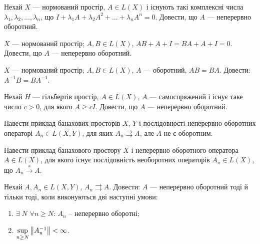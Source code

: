 \begin{exercise}
    Нехай $X$ --- нормований простір, $A \in L(X)$ і існують такі комплексні числа
    $\lambda_1, \lambda_2, ..., \lambda_n$, що $I + \lambda_1 A + \lambda_2 A^2
    + ... + \lambda_n A^n = 0$. Довести, що $A$ --- неперервно оборотний.
\end{exercise}

\begin{exercise}
    $X$ --- нормований простір; $A, B \in L(X)$, $AB+A+I=BA+A+I=0$.
    Довести, що $A$ --- неперервно оборотний.
\end{exercise}

\begin{exercise}
    $X$ --- нормований простір; $A, B \in L(X)$, $A$ --- оборотний, $AB=BA$.
    Довести: $A^{-1}B = BA^{-1}$.
\end{exercise}

\begin{exercise}
    Нехай $H$ --- гільбертів простір, $A \in L(X)$, $A$ --- самоспряжений
    і існує таке число $c > 0$, для якого $A \geq cI$.
    Довести, що $A$ --- неперервно оборотний.
\end{exercise}

\begin{exercise}
    Навести приклад банахових просторів $X$, $Y$ і послідовності неперервно
    оборотних операторі $A_n \in L(X,Y)$, для яких $A_n \rightrightarrows A$,
    але $A$ не є оборотним.
\end{exercise}

\begin{exercise}
    Навести приклад банахового простору $X$ і неперервно оборотного оператора
    $A \in L(X)$, для якого існує послідовність необоротних операторів
     $A_n \in L(X)$, що $A_n \overset{s}{\to} A$.
\end{exercise}

\begin{exercise}\label{N:1_6_36}
    Нехай $A, A_n \in L(X, Y)$, $A_n \rightrightarrows A$.
    Довести: $A$ --- неперервно оборотний тоді й тільки тоді, коли
    виконуються дві наступні умови:
    \begin{enumerate}
        \item $\exists \; N$ $\forall n \geq N$: $A_n$ -- неперервно оборотні;
        \item $\underset{n \geq N}{\sup} \left\lVert A_n^{-1}\right\rVert < \infty$.
    \end{enumerate}
\end{exercise}